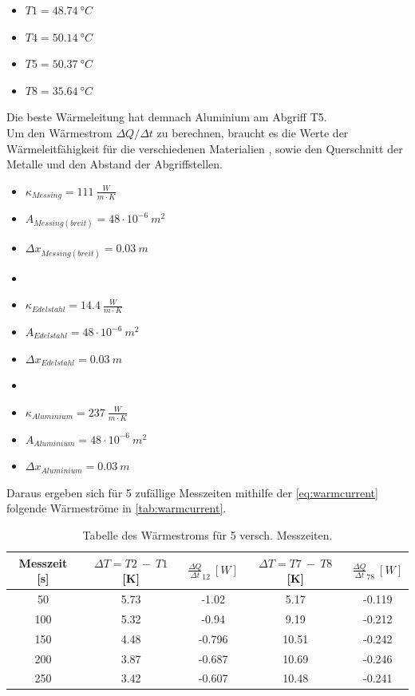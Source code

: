 \begin{itemize}
    \centering
    \item[] $T1 = 48.74\ °C$ 
    \item[] $T4 = 50.14\ °C$
    \item[] $T5 = 50.37\ °C$
    \item[] $T8 = 35.64\ °C$
\end{itemize}

Die beste Wärmeleitung hat demnach Aluminium am Abgriff T5.\\
Um den Wärmestrom $\Delta Q/\Delta t$ zu berechnen, braucht es die Werte der Wärmeleitfähigkeit für die verschiedenen Materialien \cite{web}, sowie den Querschnitt der Metalle und den Abstand der Abgriffstellen.
\newpage
\begin{itemize}
    \centering
    \item[] $\kappa_{Messing} = 111\ \frac{W}{m\cdot K}$
    \item[] $A_{Messing(breit)} = 48\cdot 10^{-6}\ m^2$
    \item[] $\Delta x_{Messing(breit)} = 0.03\ m$ 
    \item[] 
    \item[] $\kappa_{Edelstahl} = 14.4\ \frac{W}{m\cdot K}$
    \item[] $A_{Edelstahl} = 48\cdot 10^{-6}\ m^2$
    \item[] $\Delta x_{Edelstahl} = 0.03\ m$
    \item[] 
    \item[] $\kappa_{Aluminium} = 237\ \frac{W}{m\cdot K}$
    \item[] $A_{Aluminium} = 48\cdot 10^{-6}\ m^2$
    \item[] $\Delta x_{Aluminium} = 0.03\ m$
    \label{it:item} 
\end{itemize}

Daraus ergeben sich für 5 zufällige Messzeiten mithilfe der \autoref{eq:warmcurrent} folgende Wärmeströme in \autoref{tab:warmcurrent}.

\begin{table}
    \centering
    \caption{Tabelle des Wärmestroms für 5 versch. Messzeiten.}
    \begin{tabular}{c|c|c|c|c}
        \toprule
        Messzeit [s] & $\Delta T = T2\ -\ T1$ [K] & $\frac{\Delta Q}{\Delta t}_{12}\ [W]$ & $\Delta T = T7\ -\ T8$ [K] & $\frac{\Delta Q}{\Delta t}_{78}\ [W]$\\
        \midrule
        50 & 5.73 & -1.02 & 5.17 & -0.119\\
        100 & 5.32 & -0.94 & 9.19 & -0.212\\
        150 & 4.48 & -0.796 & 10.51 & -0.242\\
        200 & 3.87 & -0.687 & 10.69 & -0.246\\
        250 & 3.42 & -0.607 & 10.48 & -0.241\\
    \end{tabular}
    \label{tab:warmcurrent}
\end{table}

